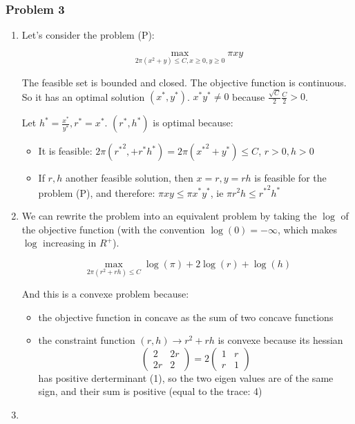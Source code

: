 \documentclass[12pt]{article}
\newcommand{\Q}[1]{\subsubsection*{Problem #1}}
\begin{document}
\Q{3}

\begin{enumerate}

\item
Let's consider the problem (P):

$$\max_{2\pi(x^2 + y) \le C, x \ge 0, y \ge 0} \pi xy$$

The feasible set is bounded and closed. The objective function is continuous. So it has an optimal solution $(x^*, y^*)$. $x^* y^* \ne 0$ because $\frac{\sqrt C}2 \frac C 2 > 0$.

Let $h^* = \frac {x^*}{y^*}, r^* = x^*$. $(r^*, h^*)$ is optimal because:

\begin{itemize}
\item It is feasible: $2\pi({r^*}^2, + r^*h^*) = 2\pi({x^*}^2 + y^*) \le C$, $r > 0, h > 0$
\item If $r, h$ another feasible solution, then $x = r, y = rh$ is feasible for the problem (P), and therefore: $\pi x y \le \pi x^* y^*$, ie $\pi r^2h \le {r^{*}}^2h^*$
\end{itemize}

\item We can rewrite the problem into an equivalent problem by taking the $\log$ of the objective function (with the convention $\log(0) = -\infty$, which makes $\log$ increasing in $R^+$).

$$\max_{2\pi(r^2+rh) \le C} \log(\pi) + 2 \log(r) + \log(h)$$

And this is a convexe problem because:

\begin{itemize}
\item the objective function in concave as the sum of two concave functions
\item the constraint function $(r,h) \rightarrow r^2 + rh$ is convexe because its hessian \[\left(\begin{array}{cc}2&2r\\2r&2\end{array} \right) = 2 \left(\begin{array}{cc}1&r\\r&1\end{array} \right)\]
has positive derterminant (1), so the two eigen values are of the same sign, and their sum is positive (equal to the trace: 4)
\end{itemize}



\item


\end{enumerate}
\end{document}
